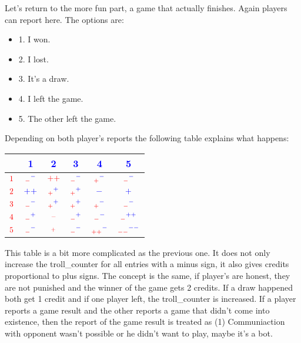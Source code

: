 \documentclass{article}
\begin{document}
%
\newline \newline
%
Let's return to the more fun part, a game that actually finishes. Again players can report here. The options are:
%
\begin{itemize}
	\item 1. I won.
	\item 2. I lost.
	\item 3. It's a draw.
	\item 4. I left the game.
	\item 5. The other left the game.
\end{itemize}
%
Depending on both player's reports the following table explains what happens:
%
\begin{center}
	\begin{tabular}{ c | c | c | c | c | c}
		 & \textcolor{blue}{1} & \textcolor{blue}{2} & \textcolor{blue}{3} & \textcolor{blue}{4} & \textcolor{blue}{5} \\ \hline
		$\textcolor{red}{1}$ & $\textcolor{red}{{}_-} \textcolor{blue}{{}^-} $ & $\textcolor{red}{++} $ & $\textcolor{red}{{}_-} \textcolor{blue}{{}^-}$ & $\textcolor{red}{{}_+} \textcolor{blue}{{}^-}$ & $\textcolor{red}{{}_-} \textcolor{blue}{{}^-}$ \\ \hline
		$\textcolor{red}{2}$ & $\textcolor{blue}{++}$ & $\textcolor{red}{{}_+} \textcolor{blue}{{}^+}$  & $\textcolor{red}{{}_+} \textcolor{blue}{{}^+}$ & $\textcolor{blue}{-}$ & $\textcolor{blue}{+}$ \\ \hline
		$\textcolor{red}{3}$ & $\textcolor{red}{{}_-} \textcolor{blue}{{}^-}$ & $\textcolor{red}{{}_+} \textcolor{blue}{{}^+}$ & $\textcolor{red}{{}_+} \textcolor{blue}{{}^+}$ & $\textcolor{red}{{}_+} \textcolor{blue}{{}^-}$ & $\textcolor{red}{{}_-} \textcolor{blue}{{}^-}$ \\ \hline
		$\textcolor{red}{4}$ &  $\textcolor{red}{{}_-} \textcolor{blue}{{}^+}$  &  $\textcolor{red}{{}_-}$  & $\textcolor{red}{{}_-} \textcolor{blue}{{}^+}$ & $\textcolor{red}{{}_-} \textcolor{blue}{{}^-}$ & $\textcolor{red}{{}_{-}} \textcolor{blue}{{}^{++}}$ \\ \hline
		$\textcolor{red}{5}$ & $\textcolor{red}{{}_-} \textcolor{blue}{{}^-}$ & $\textcolor{red}{{}_+} $ & $\textcolor{red}{{}_-} \textcolor{blue}{{}^-}$ & $\textcolor{red}{{}_{++}} \textcolor{blue}{{}^-}$ & $\textcolor{red}{{}_{--}} \textcolor{blue}{{}^{--}}$ \\
	\end{tabular}
\end{center}
%
This table is a bit more complicated as the previous one. It does not only increase the troll\_counter for all entries with a minus sign, it also gives credits proportional to plus signs. The concept is the same, if player's are honest, they are not punished and the winner of the game gets 2 credits. If a draw happened both get 1 credit and if one player left, the troll\_counter is increased. If a player reports a game result and the other reports a game that didn't come into existence, then the report of the game result is treated as (1) Communiaction with opponent wasn't possible or he didn't want to play, maybe it's a bot. 
%
\end{document}
